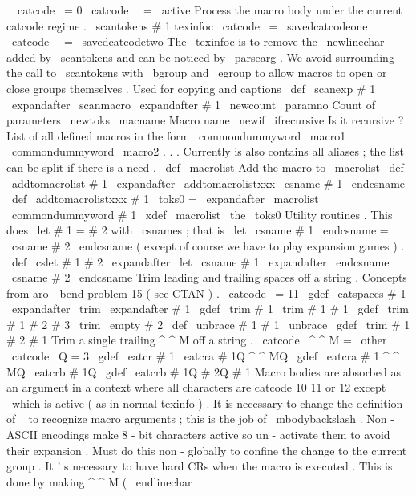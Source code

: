 {{{{\
\
catcode
\
=
0
\
catcode
\
\
=
\
active
%
%
Process
the
macro
body
under
the
current
catcode
regime
.
\
scantokens
{
#
1
texinfoc
}
%
%
\
catcode
\
=
\
savedcatcodeone
\
catcode
\
\
=
\
savedcatcodetwo
%
%
The
\
texinfoc
is
to
remove
the
\
newlinechar
added
by
\
scantokens
and
%
can
be
noticed
by
\
parsearg
.
%
We
avoid
surrounding
the
call
to
\
scantokens
with
\
bgroup
and
\
egroup
%
to
allow
macros
to
open
or
close
groups
themselves
.
}
%
Used
for
copying
and
captions
\
def
\
scanexp
#
1
{
%
\
expandafter
\
scanmacro
\
expandafter
{
#
1
}
%
}
\
newcount
\
paramno
%
Count
of
parameters
\
newtoks
\
macname
%
Macro
name
\
newif
\
ifrecursive
%
Is
it
recursive
?
%
List
of
all
defined
macros
in
the
form
%
\
commondummyword
\
macro1
\
commondummyword
\
macro2
.
.
.
%
Currently
is
also
contains
all
aliases
;
the
list
can
be
split
%
if
there
is
a
need
.
\
def
\
macrolist
{
}
%
Add
the
macro
to
\
macrolist
\
def
\
addtomacrolist
#
1
{
\
expandafter
\
addtomacrolistxxx
\
csname
#
1
\
endcsname
}
\
def
\
addtomacrolistxxx
#
1
{
%
\
toks0
=
\
expandafter
{
\
macrolist
\
commondummyword
#
1
}
%
\
xdef
\
macrolist
{
\
the
\
toks0
}
%
}
%
Utility
routines
.
%
This
does
\
let
#
1
=
#
2
with
\
csnames
;
that
is
%
\
let
\
csname
#
1
\
endcsname
=
\
csname
#
2
\
endcsname
%
(
except
of
course
we
have
to
play
expansion
games
)
.
%
\
def
\
cslet
#
1
#
2
{
%
\
expandafter
\
let
\
csname
#
1
\
expandafter
\
endcsname
\
csname
#
2
\
endcsname
}
%
Trim
leading
and
trailing
spaces
off
a
string
.
%
Concepts
from
aro
-
bend
problem
15
(
see
CTAN
)
.
{
\
catcode
\
=
11
\
gdef
\
eatspaces
#
1
{
\
expandafter
\
trim
\
expandafter
{
#
1
}
}
\
gdef
\
trim
#
1
{
\
trim
#
1
#
1
}
\
gdef
\
trim
#
1
#
2
#
3
{
\
trim
\
empty
#
2
}
\
def
\
unbrace
#
1
{
#
1
}
\
unbrace
{
\
gdef
\
trim
#
1
}
#
2
{
#
1
}
}
%
Trim
a
single
trailing
^
^
M
off
a
string
.
{
\
catcode
\
^
^
M
=
\
other
\
catcode
\
Q
=
3
%
\
gdef
\
eatcr
#
1
{
\
eatcra
#
1Q
^
^
MQ
}
%
\
gdef
\
eatcra
#
1
^
^
MQ
{
\
eatcrb
#
1Q
}
%
\
gdef
\
eatcrb
#
1Q
#
2Q
{
#
1
}
%
}
%
Macro
bodies
are
absorbed
as
an
argument
in
a
context
where
%
all
characters
are
catcode
10
11
or
12
except
\
which
is
active
%
(
as
in
normal
texinfo
)
.
It
is
necessary
to
change
the
definition
of
\
%
to
recognize
macro
arguments
;
this
is
the
job
of
\
mbodybackslash
.
%
%
Non
-
ASCII
encodings
make
8
-
bit
characters
active
so
un
-
activate
%
them
to
avoid
their
expansion
.
Must
do
this
non
-
globally
to
%
confine
the
change
to
the
current
group
.
%
%
It
'
s
necessary
to
have
hard
CRs
when
the
macro
is
executed
.
This
is
%
done
by
making
^
^
M
(
\
endlinechar
}}}
